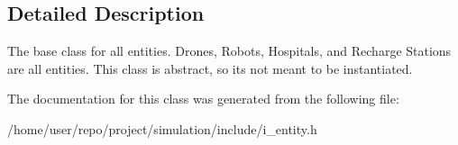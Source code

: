 \subsection{Detailed Description}
The base class for all entities. Drones, Robots, Hospitals, and Recharge Stations are all entities. This class is abstract, so it\textquotesingle{}s not meant to be instantiated. 

The documentation for this class was generated from the following file\+:\begin{DoxyCompactItemize}
\item 
/home/user/repo/project/simulation/include/i\+\_\+entity.\+h\end{DoxyCompactItemize}
